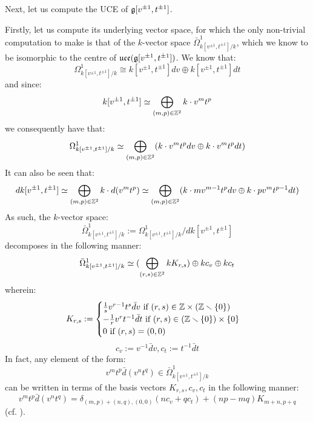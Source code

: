         \begin{example}
            Next, let us compute the UCE of $\mathfrak{g}[v^{\pm 1}, t^{\pm 1}]$. 
            
            Firstly, let us compute its underlying vector space, for which the only non-trivial computation to make is that of the $k$-vector space $\bar{\Omega}^1_{k[v^{\pm 1}, t^{\pm 1}]/k}$, which we know to be isomorphic to the centre of $\mathfrak{uce}(\mathfrak{g}[v^{\pm 1}, t^{\pm 1}])$. We know that:
                $$\Omega^1_{k[v^{\pm 1}, t^{\pm 1}]/k} \cong k[v^{\pm 1}, t^{\pm 1}] dv \oplus k[v^{\pm 1}, t^{\pm 1}] dt$$
            and since:
                $$k[v^{\pm 1}, t^{\pm 1}] \simeq \bigoplus_{(m, p) \in \mathbb{Z}^2} k \cdot v^m t^p$$
            we consequently have that:
                $$\Omega^1_{k[v^{\pm 1}, t^{\pm 1}]/k} \simeq \bigoplus_{(m, p) \in \mathbb{Z}^2} (k \cdot v^m t^p dv \oplus k \cdot v^m t^p dt)$$
            It can also be seen that:
                $$d k[v^{\pm 1}, t^{\pm 1}] \simeq \bigoplus_{(m, p) \in \mathbb{Z}^2} k \cdot d(v^m t^p) \simeq \bigoplus_{(m, p) \in \mathbb{Z}^2} ( k \cdot m v^{m - 1} t^p dv \oplus k \cdot p v^m t^{p - 1} dt )$$
            As such, the $k$-vector space:
                $$\bar{\Omega}^1_{k[v^{\pm 1}, t^{\pm 1}]/k} := \Omega^1_{k[v^{\pm 1}, t^{\pm 1}]/k}/d k[v^{\pm 1}, t^{\pm 1}]$$
            decomposes in the following manner:
                $$\bar{\Omega}^1_{k[v^{\pm 1}, t^{\pm 1}]/k} \simeq ( \bigoplus_{(r, s) \in \mathbb{Z}^2} k K_{r, s}) \oplus k c_v \oplus k c_t$$
            wherein:
                $$
                    K_{r, s} :=
                    \begin{cases}
                        \text{$\frac1s v^{r - 1} t^s \bar{d}v$ if $(r, s) \in \Z \x (\Z \setminus \{0\})$}
                        \\
                        \text{$-\frac1r v^r t^{-1} \bar{d}t$ if $(r, s) \in (\Z \setminus \{0\}) \x \{0\}$}
                        \\
                        \text{$0$ if $(r, s) = (0, 0)$}
                    \end{cases}
                $$
                $$c_v := v^{-1} \bar{d}v, c_t := t^{-1} \bar{d}t$$
            In fact, any element of the form:
                $$v^m t^p \bar{d}(v^n t^q) \in \bar{\Omega}^1_{k[v^{\pm 1}, t^{\pm 1}]/k}$$
            can be written in terms of the basis vectors $K_{r, s}, c_v, c_t$ in the following manner:
                $$v^m t^p \bar{d}(v^n t^q) = \delta_{(m, p) + (n, q), (0, 0)} ( n c_v + q c_t ) + (np - mq) K_{m + n, p + q}$$
            (cf. \cite[pp. 35]{wendlandt_formal_shift_operators_on_yangian_doubles}).


\end{example}
